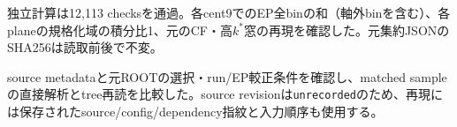 \vspace{3mm}
独立計算は12,113 checksを通過。各cent9でのEP全binの和（軸外binを含む）、各planeの規格化域の積分比1、元のCF・高$k^*$窓の再現を確認した。元集約JSONのSHA256は読取前後で不変。\par
source metadataと元ROOTの選択・run/EP較正条件を確認し、matched sampleの直接解析とtree再読を比較した。source revisionは\texttt{unrecorded}のため、再現には保存されたsource/config/dependency指紋と入力順序も使用する。
